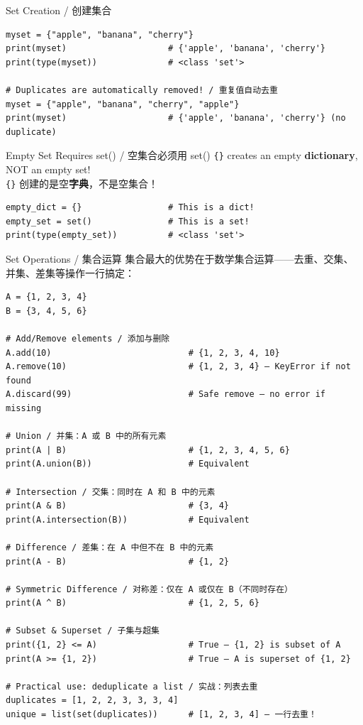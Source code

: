 \documentclass[11pt,a4paper]{report}
\let\oldtexttt\texttt
\renewcommand{\texttt}[1]{\textcolor{mainblue}{\oldtexttt{#1}}}
\begin{document}
\begin{examplebox}{Set Creation / 创建集合}
\begin{lstlisting}
myset = {"apple", "banana", "cherry"}
print(myset)                    # {'apple', 'banana', 'cherry'}
print(type(myset))              # <class 'set'>

# Duplicates are automatically removed! / 重复值自动去重
myset = {"apple", "banana", "cherry", "apple"}
print(myset)                    # {'apple', 'banana', 'cherry'} (no duplicate)
\end{lstlisting}
\end{examplebox}

\begin{warning}{Empty Set Requires set() / 空集合必须用 set()}
    \texttt{\{\}} creates an empty \textbf{dictionary}, NOT an empty set! \\
    \texttt{\{\}} 创建的是空\textbf{字典}，不是空集合！
    \begin{lstlisting}
empty_dict = {}                 # This is a dict!
empty_set = set()               # This is a set!
print(type(empty_set))          # <class 'set'>
    \end{lstlisting}
\end{warning}

\begin{examplebox}{Set Operations / 集合运算}
    集合最大的优势在于数学集合运算——去重、交集、并集、差集等操作一行搞定：
\begin{lstlisting}
A = {1, 2, 3, 4}
B = {3, 4, 5, 6}

# Add/Remove elements / 添加与删除
A.add(10)                           # {1, 2, 3, 4, 10}
A.remove(10)                        # {1, 2, 3, 4} — KeyError if not found
A.discard(99)                       # Safe remove — no error if missing

# Union / 并集：A 或 B 中的所有元素
print(A | B)                        # {1, 2, 3, 4, 5, 6}
print(A.union(B))                   # Equivalent

# Intersection / 交集：同时在 A 和 B 中的元素
print(A & B)                        # {3, 4}
print(A.intersection(B))            # Equivalent

# Difference / 差集：在 A 中但不在 B 中的元素
print(A - B)                        # {1, 2}

# Symmetric Difference / 对称差：仅在 A 或仅在 B（不同时存在）
print(A ^ B)                        # {1, 2, 5, 6}

# Subset & Superset / 子集与超集
print({1, 2} <= A)                  # True — {1, 2} is subset of A
print(A >= {1, 2})                  # True — A is superset of {1, 2}

# Practical use: deduplicate a list / 实战：列表去重
duplicates = [1, 2, 2, 3, 3, 3, 4]
unique = list(set(duplicates))      # [1, 2, 3, 4] — 一行去重！
\end{lstlisting}
\end{examplebox}
\end{document}
